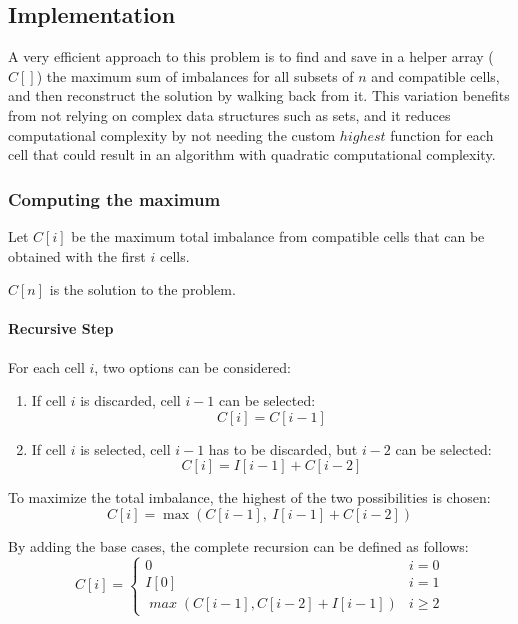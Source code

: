 \subsection{Implementation}

A very efficient approach to this problem is to find and save in a helper array ($C[]$) the maximum sum of imbalances for all subsets of $n$ and compatible cells, and then reconstruct the solution by walking back from it. This variation benefits from not relying on complex data structures such as sets, and it reduces computational complexity by not needing the custom $\mathit{highest}$ function for each cell that could result in an algorithm with quadratic computational complexity.

\subsubsection{Computing the maximum}
Let $C[i]$ be the maximum total imbalance from compatible cells that can be obtained with the first $i$ cells.

$C[n]$ is the solution to the problem.

\paragraph{Recursive Step}

For each cell $i$, two options can be considered:
\begin{enumerate}
    \item If cell $i$ is discarded, cell $i-1$ can be selected:
          \[
              C[i]=C[i-1]
          \]

    \item If cell $i$ is selected, cell $i-1$ has to be discarded, but $i-2$ can be selected:
          \[
              C[i]=I[i-1]+C[i-2]
          \]
\end{enumerate}

To maximize the total imbalance, the highest of the two possibilities is chosen:
\[
    C[i]=\max(C[i-1],\ I[i-1] + C[i-2])
\]

By adding the base cases, the complete recursion can be defined as follows:
\[
    C[i] = \begin{cases}
        0                                      & i=0      \\
        I[0]                                   & i=1      \\
        \mathit{\max}(C[i-1], C[i-2] + I[i-1]) & i \geq 2
    \end{cases}
\]

